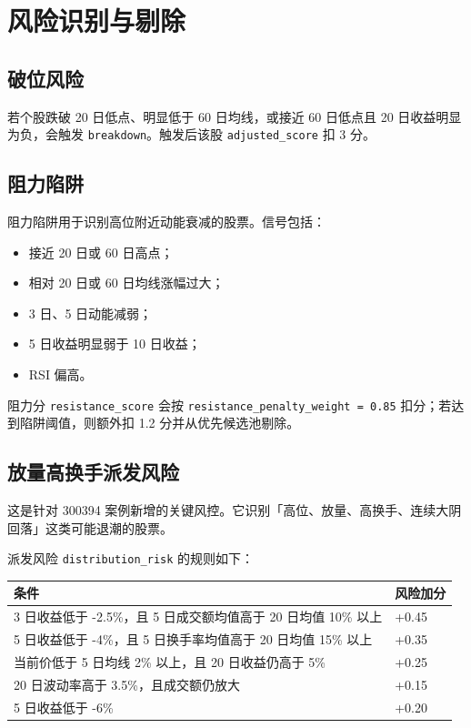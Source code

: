\documentclass[UTF8,zihao=-4]{ctexart}
\begin{document}
\section{风险识别与剔除}

\subsection{破位风险}

若个股跌破 20 日低点、明显低于 60 日均线，或接近 60 日低点且 20 日收益明显为负，会触发 \texttt{breakdown}。触发后该股 \texttt{adjusted\_score} 扣 3 分。

\subsection{阻力陷阱}

阻力陷阱用于识别高位附近动能衰减的股票。信号包括：

\begin{itemize}
  \item 接近 20 日或 60 日高点；
  \item 相对 20 日或 60 日均线涨幅过大；
  \item 3 日、5 日动能减弱；
  \item 5 日收益明显弱于 10 日收益；
  \item RSI 偏高。
\end{itemize}

阻力分 \texttt{resistance\_score} 会按 \texttt{resistance\_penalty\_weight = 0.85} 扣分；若达到陷阱阈值，则额外扣 1.2 分并从优先候选池剔除。

\subsection{放量高换手派发风险}

这是针对 300394 案例新增的关键风控。它识别「高位、放量、高换手、连续大阴回落」这类可能退潮的股票。

派发风险 \texttt{distribution\_risk} 的规则如下：

\begin{longtable}{p{10cm} p{3cm}}
\toprule
条件 & 风险加分 \\
\midrule
3 日收益低于 -2.5\%，且 5 日成交额均值高于 20 日均值 10\% 以上 & +0.45 \\
5 日收益低于 -4\%，且 5 日换手率均值高于 20 日均值 15\% 以上 & +0.35 \\
当前价低于 5 日均线 2\% 以上，且 20 日收益仍高于 5\% & +0.25 \\
20 日波动率高于 3.5\%，且成交额仍放大 & +0.15 \\
5 日收益低于 -6\% & +0.20 \\
\bottomrule
\end{longtable}
\end{document}

